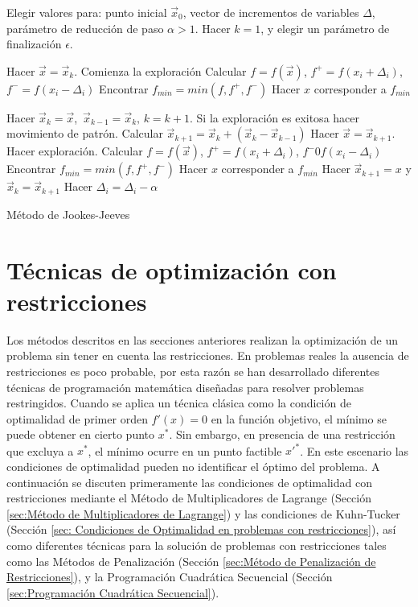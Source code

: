\begin{algorithm}
	\begin{algorithmic}[1]
		\STATE Elegir valores para: punto inicial $\vec{x}_0$, vector de incrementos de variables $\Delta$, parámetro de reducción de paso   $\alpha>1$. Hacer $k=1$, y elegir un parámetro de finalización $\epsilon$. 
        
		\WHILE {$  \epsilon <|| \Delta||$}
		\STATE Hacer $\vec{x}=\vec{x}_k$. Comienza la exploración
         \STATE Calcular $f=f(\vec{x})$, $f^+=f(x_i+ \Delta_i)$, $f^- =f(x_i- \Delta_i)$
         \STATE Encontrar $f_{min}= min(f,f^+,f^-)$
         \STATE Hacer $x$ corresponder a $f_{min}$
          \ENDFOR
          
          \STATE Hacer $\vec{x}_k=\vec{x}$,\, $\vec{x}_{k-1}=\vec{x}_k,\, k=k+1 $. Si la exploración es exitosa hacer movimiento de patrón.
          \STATE Calcular $\vec{x}_{k+1}=\vec{x}_{k}+(\vec{x}_{k}-\vec{x}_{k-1})$
           \STATE Hacer $\vec{x}=\vec{x}_{k+1}$. Hacer exploración.
            	 \STATE Calcular $f=f(\vec{x})$, $f^+=f(x_i+ \Delta_i)$, $f^-0f(x_i- \Delta_i)$
            	 \STATE Encontrar $f_{min}= min(f,f^+,f^-)$
            	 \STATE Hacer $x$ corresponder a $f_{min}$
             \ENDFOR
           \STATE Hacer $\vec{x}_{k+1}=x$ y $\vec{x}_{k}=\vec{x}_{k+1}$
          \ENDWHILE
          \ENDIF
            	 \STATE Hacer $ \Delta_i=\Delta_i-\alpha$
             \ENDFOR
		\ENDWHILE
	\end{algorithmic}
	\caption{Método de Jookes-Jeeves}\label{alg:Jookes-Jeeves}
\end{algorithm}
\section{Técnicas de optimización con restricciones}
Los métodos descritos en las secciones anteriores realizan la optimización de un problema sin tener en cuenta las restricciones. En problemas reales la ausencia de restricciones es poco probable, por esta razón se han desarrollado diferentes técnicas de programación matemática diseñadas para resolver problemas restringidos. Cuando se aplica un técnica clásica como la condición de optimalidad de primer orden $f'(x)=0$ en la función objetivo, el mínimo se puede obtener en cierto punto $x^*$. Sin embargo, en presencia de una restricción que excluya a $x^*$, el mínimo ocurre en un punto factible ${x'}^*$. En este escenario las condiciones de optimalidad pueden no identificar el óptimo del problema. A continuación se discuten primeramente las condiciones de optimalidad con restricciones mediante el Método de Multiplicadores de Lagrange (Sección \ref{sec:Método de Multiplicadores de Lagrange}) y las condiciones de Kuhn-Tucker (Sección \ref{sec: Condiciones de Optimalidad en problemas con restricciones}), así como diferentes técnicas para la solución de problemas con restricciones tales como las Métodos de Penalización (Sección \ref{sec:Método de Penalización de Restricciones}), y la Programación Cuadrática Secuencial (Sección \ref{sec:Programación Cuadrática Secuencial}).

